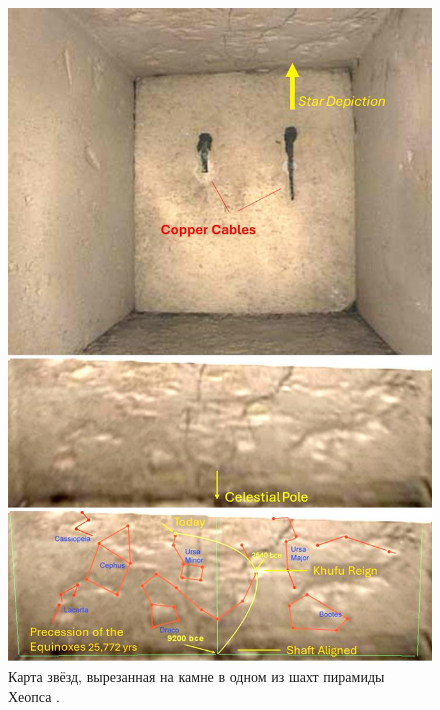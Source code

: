 \documentclass[10pt,twocolumn,letterpaper]{article}
\begin{document}
\begin{figure}[H]
\begin{center}

   \includegraphics[width=1\linewidth]{star-stone.jpg}
\end{center}
   \caption{Карта звёзд, вырезанная на камне в одном из шахт пирамиды Хеопса \cite{28}.}
\label{fig:20}
\label{fig:onecol}
\end{figure}
\end{document}
